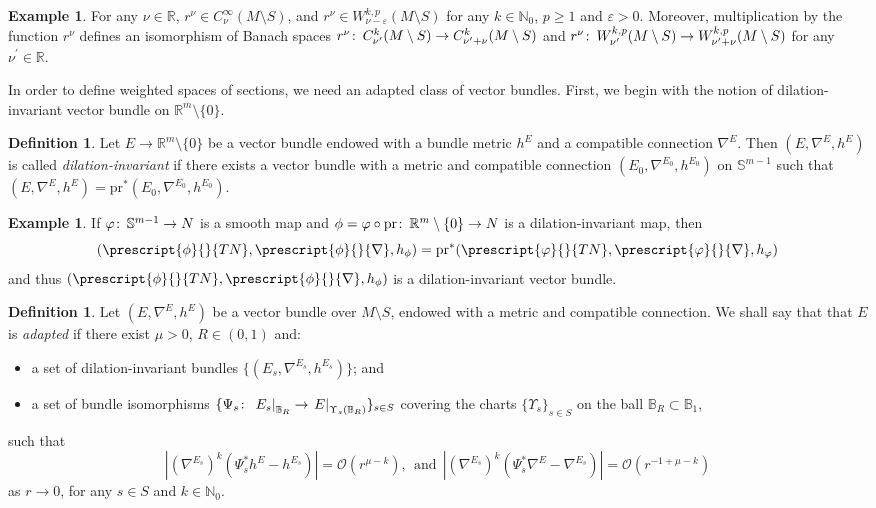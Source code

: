\documentclass{article}
\numberwithin{equation}{section}        %
\theoremstyle{bfnote}
\theoremstyle{definition}
\newtheorem{Def}[thm]{Definition}           %
\theoremstyle{bfremark}
\newtheorem{ex}[thm]{Example}               %
\newcommand{\col}{\colon \thinspace}        %
\newcommand{\N}{\mathbb{N}}                 %
\newcommand{\R}{\mathbb{R}}                 %
\newcommand{\Ball}{\mathbb{B}}              %
\newcommand{\Sp}{\mathbb{S}}                %
\newcommand{\pr}{\mathrm{pr}}               %
\begin{document}
\begin{ex}
    For any $\nu \in \R$, $r^{\nu} \in C^\infty_{\nu}(M \setminus S)$, and $r^\nu \in W^{k,p}_{\nu-\varepsilon}(M \setminus S)$ for any $k \in \N_0$, $p \geq 1$ and $\varepsilon > 0$. Moreover, multiplication by the function $r^\nu$ defines an isomorphism of Banach spaces $r^\nu \col C^{k}_{\nu^{\prime}}(M \setminus S) \to C^{k}_{\nu^{\prime}+\nu}(M \setminus S)$ and $r^\nu \col W^{k,p}_{\nu^{\prime}}(M \setminus S) \to W^{k,p}_{\nu^{\prime}+\nu}(M \setminus S)$ for any $\nu^{\prime} \in \R$.
\end{ex}

In order to define weighted spaces of sections, we need an adapted class of vector bundles. First, we begin with the notion of dilation-invariant vector bundle on $\R^m \setminus \{0\}$.

\begin{Def}
    Let $E \to \R^m \setminus \{0\}$ be a vector bundle endowed with a bundle metric $h^E$ and a compatible connection $\nabla^E$. Then $(E,\nabla^E,h^E)$ is called \emph{dilation-invariant} if there exists a vector bundle with a metric and compatible connection $(E_0,\nabla^{E_0},h^{E_0})$ on $\Sp^{m-1}$ such that $(E,\nabla^E,h^E) = \pr^*(E_0,\nabla^{E_0},h^{E_0})$.
\end{Def}

\begin{ex}
    If $\varphi \col \Sp^{m-1} \to N$ is a smooth map and $\phi = \varphi \circ \pr \col \R^m \setminus \{0\} \to N$ is a dilation-invariant map, then 
    \begin{equation*}
        (\prescript{\phi}{}{TN},\prescript{\phi}{}{\nabla},h_\phi) = \pr^*(\prescript{\varphi}{}{TN},\prescript{\varphi}{}{\nabla},h_\varphi)
    \end{equation*}
    and thus $(\prescript{\phi}{}{TN},\prescript{\phi}{}{\nabla},h_\phi)$ is a dilation-invariant vector bundle.
\end{ex}

\begin{Def}
    Let $(E,\nabla^E,h^E)$ be a vector bundle over $M \setminus S$, endowed with a metric and compatible connection. We shall say that that $E$ is \emph{adapted} if there exist $\mu > 0$, $R \in (0,1)$ and:
    \begin{itemize}
        \item a set of dilation-invariant bundles $\{(E_s,\nabla^{E_s},h^{E_s})\}$; and
        \item a set of bundle isomorphisms $\{ \Psi_s \col \left. E_s \right|_{\Ball_R} \to \left. E \right|_{\Upsilon_s(\Ball_R)} \}_{s \in S}$ covering the charts $\{\Upsilon_s\}_{s \in S}$ on the ball $\Ball_R \subset \Ball_1$,
    \end{itemize}
    such that
    \begin{equation*}
        |(\nabla^{E_s})^k (\Psi_s^* h^E - h^{E_s})| = \mathcal{O}(r^{\mu-k}), ~~ \text{and} ~~ |(\nabla^{E_s})^k(\Psi_s^*\nabla^E - \nabla^{E_s})| = \mathcal{O}(r^{-1+\mu-k})
    \end{equation*}
    as $r \to 0$, for any $s \in S$ and $k \in \N_0$.
\end{Def}
\end{document}

